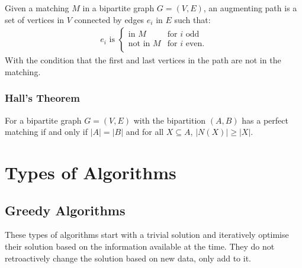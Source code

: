\documentclass[a4paper, 12pt, twoside]{article}
\begin{document}
Given a matching $M$ in a bipartite graph $G = (V, E)$, 
an augmenting path is a set of vertices in $V$ connected
by edges $e_i$ in $E$ such that: \begin{align*}
  e_i \text{ is } \begin{cases}
    \text{in } M & \text{for } i \text{ odd} \\
    \text{not in } M & \text{for } i \text{ even}. \\
  \end{cases}
\end{align*} With the condition that the first and last vertices
in the path are not in the matching.

\subsubsection{Hall's Theorem}

For a bipartite graph $G = (V, E)$ with the bipartition $(A, B)$ has
a perfect matching if and only if $|A| = |B|$ and for all 
$X \subseteq A$, $|N(X)| \geq |X|$. 

\section{Types of Algorithms}

\subsection{Greedy Algorithms}

These types of algorithms start with a trivial solution and
iteratively optimise their solution based on the information
available at the time. They do not retroactively change the solution
based on new data, only add to it.
\end{document}
